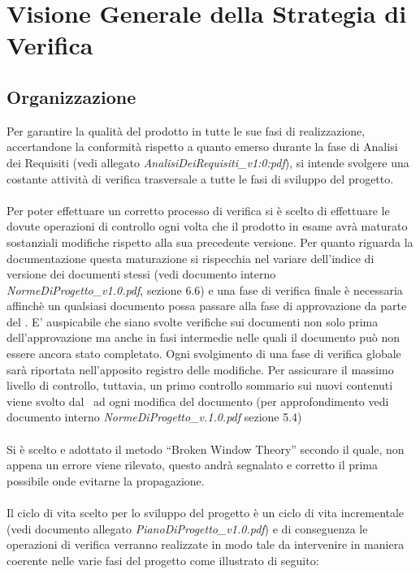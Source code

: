 \section{Visione Generale della Strategia di Verifica}

\subsection{Organizzazione}

Per garantire la qualità del prodotto in tutte le sue fasi di realizzazione, accertandone la conformità rispetto a quanto emerso durante la fase di Analisi dei Requisiti (vedi allegato \textit{AnalisiDeiRequisiti\_v1:0:pdf}), si intende svolgere una costante attività di verifica trasversale a tutte le fasi di sviluppo del progetto.\\ \\
Per poter effettuare un corretto processo di verifica si è scelto di effettuare le
dovute operazioni di controllo ogni volta che il prodotto in esame avrà maturato sostanziali modifiche rispetto alla sua precedente versione. Per quanto riguarda la documentazione questa maturazione si rispecchia nel variare dell'indice di versione dei documenti stessi (vedi documento interno \textit{NormeDiProgetto\_v1.0.pdf}, sezione 6.6) e una fase di verifica finale è necessaria affinchè un qualsiasi documento possa passare alla fase di approvazione da parte del \ruoloResponsabile. E' auspicabile che siano svolte verifiche sui documenti non solo prima dell'approvazione ma anche in fasi intermedie nelle quali il documento può non essere ancora stato completato. Ogni svolgimento di una fase di verifica globale sarà riportata nell'apposito registro delle modifiche. Per assicurare il massimo livello di controllo, tuttavia, un primo controllo sommario sui nuovi contenuti viene svolto dal \ruoloVerificatore\ ad ogni modifica del documento (per approfondimento vedi documento interno \textit{NormeDiProgetto\_v.1.0.pdf} sezione 5.4)
\\ \\
Si è scelto e adottato il metodo ``Broken Window Theory'' secondo il quale, non appena un errore viene rilevato, questo andrà segnalato e corretto il prima possibile onde evitarne la propagazione.
\\ \\
Il ciclo di vita scelto per lo sviluppo del progetto è un ciclo di vita incrementale (vedi documento allegato \textit{PianoDiProgetto\_v1.0.pdf}) e di conseguenza le
operazioni di verifica verranno realizzate in modo tale da intervenire in maniera
coerente nelle varie fasi del progetto come illustrato di seguito:

